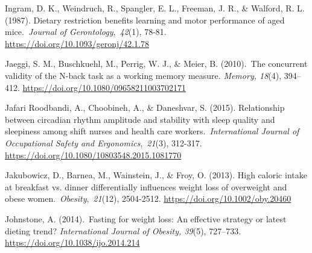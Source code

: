 \documentclass[authordate, empirical]{jote-new-article}
\begin{document}
Ingram, D. K., Weindruch, R., Spangler, E. L., Freeman, J. R., \& Walford, R. L. (1987). Dietary restriction benefits learning and motor performance of aged mice. \emph{Journal of Gerontology}, \emph{42}(1), 78-81. \url{https://doi.org/10.1093/geronj/42.1.78}



Jaeggi, S. M., Buschkuehl, M., Perrig, W. J., \& Meier, B. (2010). The concurrent validity of the N-back task as a working memory measure.\emph{ Memory, 18}(4), 394--412. \url{https://doi.org/10.1080/09658211003702171}



Jafari Roodbandi, A., Choobineh, A., \& Daneshvar, S. (2015). Relationship between circadian rhythm amplitude and stability with sleep quality and sleepiness among shift nurses and health care workers. \emph{International Journal of Occupational Safety and Ergonomics}, \emph{21}(3), 312-317. \url{https://doi.org/10.1080/10803548.2015.1081770}



Jakubowicz, D., Barnea, M., Wainstein, J., \& Froy, O. (2013). High caloric intake at breakfast vs. dinner differentially influences weight loss of overweight and obese women. \emph{Obesity}, \emph{21}(12), 2504-2512. \url{https://doi.org/10.1002/oby.20460}









Johnstone, A. (2014). Fasting for weight loss: An effective strategy or latest dieting trend?\emph{ International Journal of Obesity, 39}(5), 727--733. \url{https://doi.org/10.1038/ijo.2014.214}



\end{document}
